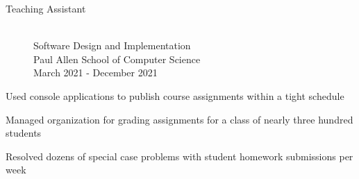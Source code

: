 \documentclass[10pt]{article}
\newenvironment{itemize*}
{\begin{itemize}[leftmargin=*]
    \setlength{\parskip}{0.5pt}}
{\end{itemize}}
\begin{document}
\begin{paracol}{2}
\begin{description}
\item[Teaching Assistant] \hfill \\
    Software Design and Implementation \\
    Paul Allen School of Computer Science \\
    March 2021 - December 2021
\end{description}
\begin{itemize*}
\item Used console applications to publish course assignments within a tight schedule
\item Managed organization for grading assignments for a class of nearly three
      hundred students
\item Resolved dozens of special case problems with student homework
      submissions per week
\end{itemize*}
\end{paracol}
\end{document}
